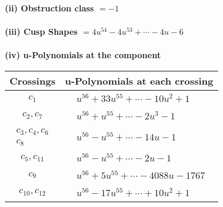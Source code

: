 \documentclass[1p]{elsarticle_modified}
\theoremstyle{definition}
\begin{document}
\flushleft \textbf{(ii) Obstruction class $= -1$}\\~\\
\flushleft \textbf{(iii) Cusp Shapes $= 4 u^{54}-4 u^{53}+\cdots-4 u-6$}\\~\\
\newpage\renewcommand{\arraystretch}{1}
\flushleft \textbf{(iv) u-Polynomials at the component}\newline \\
\begin{tabular}{m{50pt}|m{274pt}}
Crossings & \hspace{64pt}u-Polynomials at each crossing \\
\hline $$\begin{aligned}c_{1}\end{aligned}$$&$\begin{aligned}
&u^{56}+33 u^{55}+\cdots-10 u^2+1
\end{aligned}$\\
\hline $$\begin{aligned}c_{2},c_{7}\end{aligned}$$&$\begin{aligned}
&u^{56}+u^{55}+\cdots-2 u^3-1
\end{aligned}$\\
\hline $$\begin{aligned}c_{3},c_{4},c_{6}\\c_{8}\end{aligned}$$&$\begin{aligned}
&u^{56}- u^{55}+\cdots-14 u-1
\end{aligned}$\\
\hline $$\begin{aligned}c_{5},c_{11}\end{aligned}$$&$\begin{aligned}
&u^{56}- u^{55}+\cdots-2 u-1
\end{aligned}$\\
\hline $$\begin{aligned}c_{9}\end{aligned}$$&$\begin{aligned}
&u^{56}+5 u^{55}+\cdots-4088 u-1767
\end{aligned}$\\
\hline $$\begin{aligned}c_{10},c_{12}\end{aligned}$$&$\begin{aligned}
&u^{56}-17 u^{55}+\cdots+10 u^2+1
\end{aligned}$\\
\hline
\end{tabular}\\~\\
\end{document}
